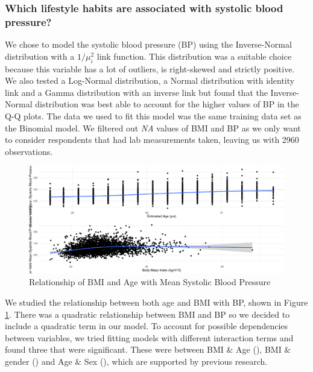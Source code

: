\documentclass[
  11pt,
  twocolumn]{article}
\begin{document}
\subsubsection{Which lifestyle habits are associated with systolic blood
pressure?}\label{which-lifestyle-habits-are-associated-with-systolic-blood-pressure}

We chose to model the systolic blood pressure (BP) using the
Inverse-Normal distribution with a \(1/\mu_i^2\) link function. This
distribution was a suitable choice because this variable has a lot of
outliers, is right-skewed and strictly positive. We also tested a
Log-Normal distribution, a Normal distribution with identity link and a
Gamma distribution with an inverse link but found that the
Inverse-Normal distribution was best able to account for the higher
values of BP in the Q-Q plots. The data we used to fit this model was
the same training data set as the Binomial model. We filtered out
\emph{NA} values of BMI and BP as we only want to consider respondents
that had lab measurements taken, leaving us with 2960 observations.

\begin{figure}[H]
\includegraphics{Coursework_files/figure-latex/output-relationship-plots-1} \caption{Relationship of BMI and Age with Mean Systolic Blood Pressure}\label{fig:output-relationship-plots}
\end{figure}

We studied the relationship between both age and BMI with BP, shown in
Figure \ref{fig:output-relationship-plots}. There was a quadratic
relationship between BMI and BP so we decided to include a quadratic
term in our model. To account for possible dependencies between
variables, we tried fitting models with different interaction terms and
found three that were significant. These were between BMI \& Age
(), BMI \& gender
() and Age \& Sex
(), which are supported by previous
research.
\end{document}
